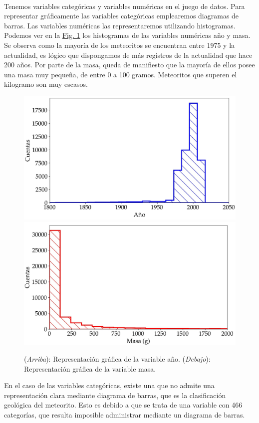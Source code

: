 \documentclass[12pt]{article}
\begin{document}
	\\
	Tenemos variables categóricas y variables numéricas en el juego de datos. Para representar gráficamente las variables categóricas emplearemos diagramas de barras. Las variables numéricas las representaremos utilizando histogramas. Podemos ver en la \hyperref[Fig:year_mass]{Fig. 1} los histogramas de las variables numéricas año y masa. Se observa como la mayoría de los meteoritos se encuentran entre 1975 y la actualidad, es lógico que dispongamos de más registros de la actualidad que hace 200 años. Por parte de la masa, queda de manifiesto que la mayoría de ellos posee una masa muy pequeña, de entre 0 a 100 gramos. Meteoritos que superen el kilogramo son muy escasos.
	\begin{figure}[t]
		\centering
		\label{Fig:year_mass}
		\includegraphics[scale = 0.55]{year_distribution}
		\includegraphics[scale = 0.55]{mass_distribution}
		\caption{(\textit{Arriba}): Representación gráfica de la variable año. (\textit{Debajo}): Representación gráfica de la variable masa.}
	\end{figure}
    En el caso de las variables categóricas, existe una que no admite una representación clara mediante diagrama de barras, que es la clasificación geológica del meteorito. Esto es debido a que se trata de una variable con 466 categorías, que resulta imposible administrar mediante un diagrama de barras.\\
\end{document}
